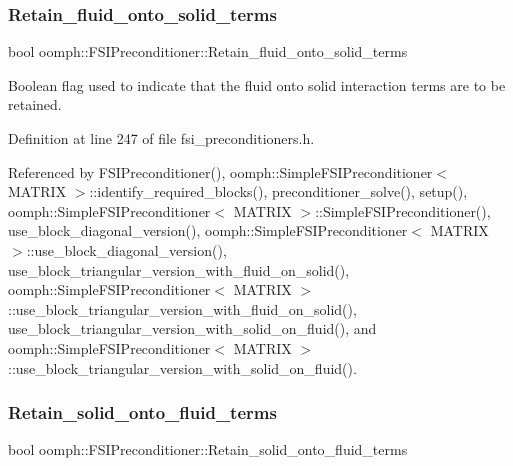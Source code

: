 \subsubsection{\texorpdfstring{Retain\+\_\+fluid\+\_\+onto\+\_\+solid\+\_\+terms}{Retain\_fluid\_onto\_solid\_terms}}
{\footnotesize\ttfamily bool oomph\+::\+F\+S\+I\+Preconditioner\+::\+Retain\+\_\+fluid\+\_\+onto\+\_\+solid\+\_\+terms\hspace{0.3cm}{\ttfamily [private]}}



Boolean flag used to indicate that the fluid onto solid interaction terms are to be retained. 



Definition at line 247 of file fsi\+\_\+preconditioners.\+h.



Referenced by F\+S\+I\+Preconditioner(), oomph\+::\+Simple\+F\+S\+I\+Preconditioner$<$ M\+A\+T\+R\+I\+X $>$\+::identify\+\_\+required\+\_\+blocks(), preconditioner\+\_\+solve(), setup(), oomph\+::\+Simple\+F\+S\+I\+Preconditioner$<$ M\+A\+T\+R\+I\+X $>$\+::\+Simple\+F\+S\+I\+Preconditioner(), use\+\_\+block\+\_\+diagonal\+\_\+version(), oomph\+::\+Simple\+F\+S\+I\+Preconditioner$<$ M\+A\+T\+R\+I\+X $>$\+::use\+\_\+block\+\_\+diagonal\+\_\+version(), use\+\_\+block\+\_\+triangular\+\_\+version\+\_\+with\+\_\+fluid\+\_\+on\+\_\+solid(), oomph\+::\+Simple\+F\+S\+I\+Preconditioner$<$ M\+A\+T\+R\+I\+X $>$\+::use\+\_\+block\+\_\+triangular\+\_\+version\+\_\+with\+\_\+fluid\+\_\+on\+\_\+solid(), use\+\_\+block\+\_\+triangular\+\_\+version\+\_\+with\+\_\+solid\+\_\+on\+\_\+fluid(), and oomph\+::\+Simple\+F\+S\+I\+Preconditioner$<$ M\+A\+T\+R\+I\+X $>$\+::use\+\_\+block\+\_\+triangular\+\_\+version\+\_\+with\+\_\+solid\+\_\+on\+\_\+fluid().

\mbox{\label{classoomph_1_1FSIPreconditioner_acecba46494b0aa6f2035020f53be634c}} 
\subsubsection{\texorpdfstring{Retain\+\_\+solid\+\_\+onto\+\_\+fluid\+\_\+terms}{Retain\_solid\_onto\_fluid\_terms}}
{\footnotesize\ttfamily bool oomph\+::\+F\+S\+I\+Preconditioner\+::\+Retain\+\_\+solid\+\_\+onto\+\_\+fluid\+\_\+terms\hspace{0.3cm}{\ttfamily [private]}}



